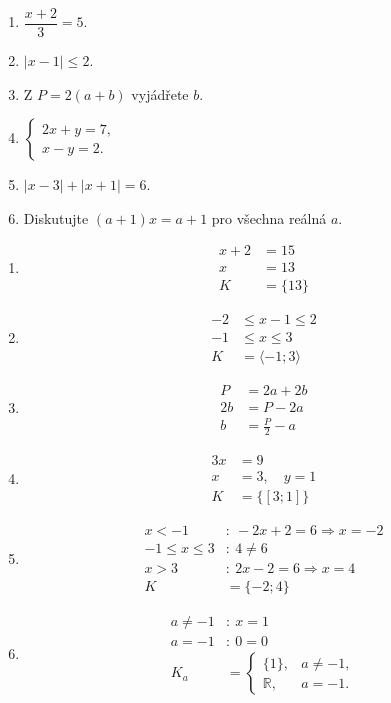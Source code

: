 \documentclass[11pt,a4paper]{article}
\begin{document}
\begin{zadaniReseniBox}[title={Domácí úkol}]
\begin{enumerate}[label=\alph*),itemsep=2pt]
\item $\dfrac{x+2}{3}=5$.
\item $|x-1|\le2$.
\item Z $P=2(a+b)$ vyjádřete $b$.
\item $\begin{cases}2x+y=7,\\x-y=2.\end{cases}$
\item $|x-3|+|x+1|=6$.
\item Diskutujte $(a+1)x=a+1$ pro všechna reálná $a$.
\end{enumerate}
\tcblower
\begin{enumerate}[label=\alph*),itemsep=1pt]
\item
\[\begin{aligned}
x+2&=15 \\
x&=13 \\
K&=\{13\}
\end{aligned}\]
\item
\[\begin{aligned}
-2&\le x-1\le2 \\
-1&\le x\le3 \\
K&=\langle-1;3\rangle
\end{aligned}\]
\item
\[\begin{aligned}
P&=2a+2b \\
2b&=P-2a \\
b&=\frac P2-a
\end{aligned}\]
\item
\[\begin{aligned}
3x&=9 \\
x&=3,\quad y=1 \\
K&=\{[3;1]\}
\end{aligned}\]
\item
\[\begin{aligned}
x<-1&:\ -2x+2=6\Rightarrow x=-2 \\
-1\le x\le3&:\ 4\ne6 \\
x>3&:\ 2x-2=6\Rightarrow x=4 \\
K&=\{-2;4\}
\end{aligned}\]
\item
\[\begin{aligned}
a\ne-1&:\ x=1 \\
a=-1&:\ 0=0 \\
K_a&=\begin{cases}\{1\},&a\ne-1,\\\mathbb R,&a=-1.\end{cases}
\end{aligned}\]
\end{enumerate}
\end{zadaniReseniBox}
\end{document}
